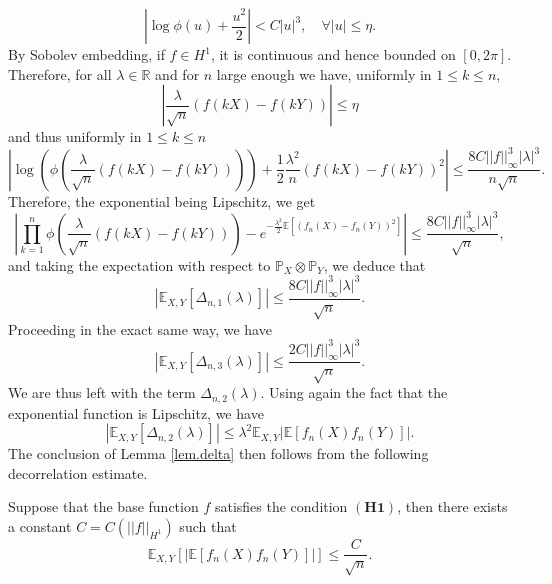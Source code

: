 \documentclass{svproc}
\newcommand \Esp {\mathbb{E}}
\begin{document}
\[
\left|\log \phi(u) +\frac{u^2}{2}\right| < C|u|^3, \quad \forall |u| \leq \eta.
\]
By Sobolev embedding, if $f \in H^1$, it is continuous and hence bounded on $[0, 2\pi]$. Therefore, for all ${\lambda} \in \mathbb R$ and for $n$ large enough we have, uniformly in $1\leq k  \leq n$, 
\[
\left| \frac{{\lambda}}{\sqrt{n}}(f(kX)-f(kY)) \right| \leq \eta
\]
and thus uniformly in $1\leq k  \leq n$
\[
\left| \log\left(\phi\left(\frac{{\lambda}}{\sqrt{n}}(f(kX)-f(kY))\right) \right) +\frac{1}{2}\frac{{\lambda}^2}{n}(f(kX)-f(kY))^2\right| \leq \frac{8C||f||_{\infty}^3 |{\lambda}|^3}{n\sqrt{n}}.
\]
Therefore, the exponential being Lipschitz, we get 
\[
\left|\prod_{k=1}^{n}\phi\left(\frac{{\lambda}}{\sqrt{n}}(f(kX)-f(kY))\right)-e^{-\frac{{\lambda}^2}{2}\Esp[(f_n(X)-f_n(Y))^2]}\right| \leq \frac{8C||f||_{\infty}^3 |{\lambda}|^3}{\sqrt{n}},
\]
and taking the expectation with respect to $\mathbb P_X \otimes \mathbb P_Y$, we deduce that 
\[
|\Esp_{X,Y}\left[\Delta_{n,1}({\lambda})\right]| \leq \frac{8C||f||_{\infty}^3 |{\lambda}|^3}{\sqrt{n}}.
\]
Proceeding in the exact same way, we have
\[
|\Esp_{X,Y}\left[\Delta_{n,3}({\lambda})\right]| \leq \frac{2C||f||_{\infty}^3 |{\lambda}|^3}{\sqrt{n}}.
\]
We are thus left with the term $\Delta_{n,2}({\lambda})$. Using again the fact that the exponential function is Lipschitz, we have 
\[
|\Esp_{X,Y}\left[\Delta_{n,2}({\lambda})\right] |\leq {\lambda}^2\Esp_{X,Y} \left|\Esp[f_n(X)f_n(Y)]\right|.
\]
The conclusion of Lemma \ref{lem.delta} then follows from the following decorrelation estimate.
\begin{lemma}{Suppose that the base function $f$ satisfies the condition $\mathbf{(H1)}$}, then there exists a constant $C=C(||f||_{H^1})$ such that
\[
\mathbb E_{X,Y} \left[ \left|\mathbb E[f_n(X)f_n(Y)] \right|\right]\leq \frac{C}{\sqrt{n}}.
\]\label{lem.decorel}
\end{lemma}
\end{document}
